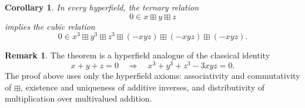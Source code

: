 \documentclass{article}
\newtheorem{corollary}[theorem]{Corollary}
\theoremstyle{definition}
\newtheorem{remark}[theorem]{Remark}
\begin{document}
\begin{corollary}
In every hyperfield, the ternary relation
\[
0\in x\boxplus y\boxplus z
\]
implies the cubic relation
\[
0\in x^3\boxplus y^3\boxplus z^3\boxplus(-xyz)\boxplus(-xyz)\boxplus(-xyz).
\]
\end{corollary}

\begin{remark}
The theorem is a hyperfield analogue of the classical identity
\[
x+y+z=0\quad\Longrightarrow\quad x^3+y^3+z^3-3xyz=0.
\]
The proof above uses only the hyperfield axioms: associativity and commutativity of
\(\boxplus\), existence and uniqueness of additive inverses, and distributivity of
multiplication over multivalued addition.
\end{remark}
\end{document}
